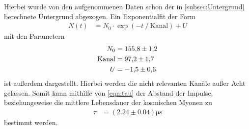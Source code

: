 Hierbei wurde von den aufgenommenen Daten schon der in \autoref{subsec:Untergrund} berechnete Untergrund abgezogen.
Ein Exponentialfit der Form
\begin{align*}
  N(t) &= N_0 \cdot \exp(-t \mathbin{/} \text{Kanal})+U
\end{align*}
mit den Parametern 
\begin{align*}
  N_0 &= \num{155.8 \pm 1.2}\\
  \text{Kanal} &= \num{97.2 \pm 1.7}\\
  U&= \num{-1.5 \pm 0.6}
\end{align*}
ist außerdem dargestellt.
Hierbei werden die nicht relevanten Kanäle außer Acht gelassen.
Somit kann mithilfe von \autoref{eqn:tau} der Abstand der Impulse, beziehungsweise die mittlere Lebensdauer der kosmischen Myonen
zu 
\begin{align*}
  \tau &= (2.24 \pm 0.04)\si{\micro\second}
\end{align*}
bestimmt werden.

